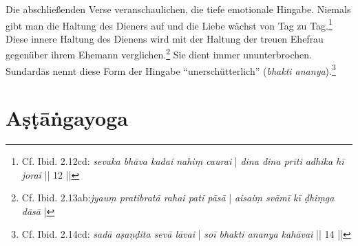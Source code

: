 Die abschließenden Verse veranschaulichen, die tiefe emotionale Hingabe. Niemals gibt man die Haltung des Dieners auf und die Liebe wächst von Tag zu Tag.\footnote{Cf. Ibid. 2.12cd: \textit{sevaka bhāva kadai nahiṃ caurai} | \textit{dina dina prīti adhika hī jorai} || 12 ||} Diese innere Haltung des Dienens wird mit der Haltung der treuen Ehefrau gegenüber ihrem Ehemann verglichen.\footnote{Cf. Ibid. 2.13ab:\textit{jyauṃ pratibratā rahai pati pāsā} | \textit{aisaiṃ svāmī kī ḍhiṃga dāsā} |} Sie dient immer ununterbrochen. Sundardās nennt diese Form der Hingabe ``unerschütterlich'' (\textit{bhakti ananya}).\footnote{Cf. Ibid. 2.14cd: \textit{sadā aṣaṇḍita sevā lāvai} | \textit{soī bhakti ananya kahāvai} || 14 ||} 

\section{Aṣṭāṅgayoga}
\label{ahstangayoga}


